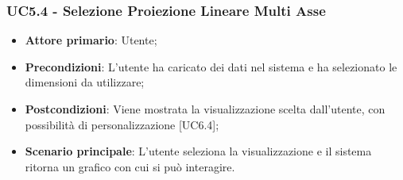 \subsubsection{UC5.4 - Selezione Proiezione Lineare Multi Asse}

\begin{itemize}
	\item \textbf{Attore primario}: Utente;
	\item \textbf{Precondizioni}: L'utente ha caricato dei dati nel sistema e ha selezionato le dimensioni da utilizzare;
	\item \textbf{Postcondizioni}: Viene mostrata la visualizzazione  scelta dall'utente, con possibilità di personalizzazione [UC6.4];
	\item \textbf{Scenario principale}: L'utente seleziona la visualizzazione  e il sistema ritorna un grafico con cui si può interagire.
\end{itemize}